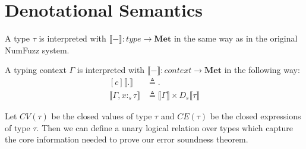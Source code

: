 \section{Denotational Semantics}

\begin{definition}
  A type $\tau$ is interpreted with $\llbracket - \rrbracket : \textit{type} \to
  \textbf{Met}$ in the same way as in the original NumFuzz system.
\end{definition}


\begin{definition}
  A typing context $\Gamma$ is interpreted with $\llbracket - \rrbracket :
  \textit{context} \to \textbf{Met}$ in the following way:
  \begin{equation}
  \begin{aligned}[c]
    \llbracket . \rrbracket &\triangleq . \\
    \llbracket \Gamma, x :_s \tau \rrbracket &\triangleq \llbracket \Gamma \rrbracket
      \times D_s \llbracket \tau \rrbracket
  \end{aligned}
  \end{equation}
\end{definition}

Let $CV(\tau)$ be the closed values of type $\tau$ and $CE(\tau)$ be the closed
expressions of type $\tau$. Then we can define a unary logical relation over types which
capture the core information needed to prove our error soundness theorem.

